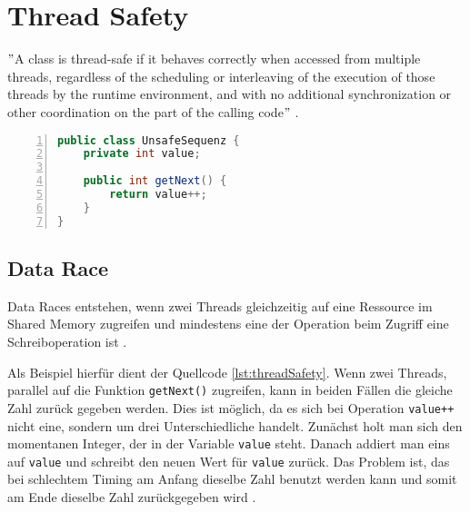 \section{Thread Safety}\label{sec:threadSafety}

$"$A class is thread-safe if it behaves correctly when accessed from multiple threads, regardless of the scheduling or interleaving of the execution of those threads by the runtime environment, and with no additional synchronization or other coordination on the part of the calling code$"$ \cite[12]{brian}.\\ %

\begin{lstlisting}[language=Java,frame=tb,caption={Non-thread-safe Sequence Generator \cite{brian}}, label={lst:threadSafety}, numbers=left, stepnumber=1, captionpos=b]
public class UnsafeSequenz {
	private int value;

	public int getNext() {
		return value++;
	}
}
\end{lstlisting}

\subsection*{Data Race}

Data Races entstehen, wenn zwei Threads gleichzeitig auf eine Ressource im Shared Memory zugreifen und mindestens eine der Operation beim Zugriff eine Schreiboperation ist \cite[vgl.][72]{banerjee_theory_2006}. 

Als Beispiel hierfür dient der Quellcode \ref{lst:threadSafety}. Wenn zwei Threads, parallel auf die Funktion \texttt{getNext()} zugreifen, kann in beiden Fällen die gleiche Zahl zurück gegeben werden. Dies ist möglich, da es sich bei Operation \texttt{value++} nicht eine, sondern um drei Unterschiedliche handelt. Zunächst holt man sich den momentanen Integer, der in der Variable \texttt{value} steht. Danach addiert man eins auf \texttt{value} und schreibt den neuen Wert für \texttt{value} zurück. Das Problem ist, das bei schlechtem Timing am Anfang dieselbe Zahl benutzt werden kann und somit am Ende dieselbe Zahl zurückgegeben wird \cite[vgl.][5]{brian}.

